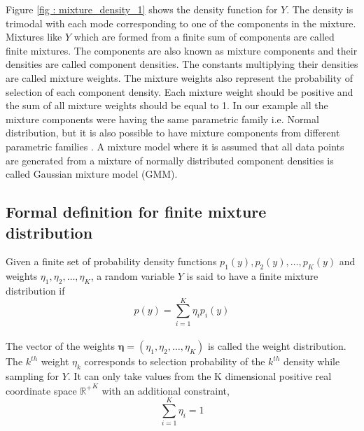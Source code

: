 Figure \ref{fig : mixture_density_1} shows the density function for $Y$. The density is trimodal with each mode corresponding to one of the components in the mixture. Mixtures like $Y$ which are formed from a finite sum of components are called finite mixtures. The components are also known as mixture components and their densities are called component densities. The constants multiplying their densities are called mixture weights. The mixture weights also represent the probability of selection of each component density. Each mixture weight should be positive and the sum of all mixture weights should be equal to 1. In our example all the  mixture components were having the same parametric family i.e. Normal distribution, but it is also possible to have mixture components from different parametric families \citep[pg. 4]{fruhwirth-schnatter_finite_2013}. A mixture model where it is assumed that all data points are generated from a mixture of normally distributed component densities is called Gaussian mixture model (GMM).\\

\subsection{Formal definition for finite mixture distribution}
\label{subsec : formal_def_mixture_dist}
Given a finite set of probability density functions $p_1(y), p_2(y), \ldots, p_K(y)$ and weights $\eta_1, \eta_2, \ldots, \eta_K$, a random variable $Y$ is said to have a finite mixture distribution if\\
$$p(y) = \sum_{i=1}^{K} \eta_{i} p_{i}(y)$$\\
The vector of the weights $\boldsymbol{\eta} = (\eta_1, \eta_2, \ldots, \eta_K)$ is called the weight distribution. The $k^{th}$ weight $\eta_{k}$ corresponds to selection probability of the $k^{th}$ density while sampling for $Y$. It can only take values from the K dimensional positive real coordinate space ${\mathbb{R}^{+}}^K$ with an additional constraint,\\
$$\sum_{i=1}^{K} \eta_{i} = 1$$\\

